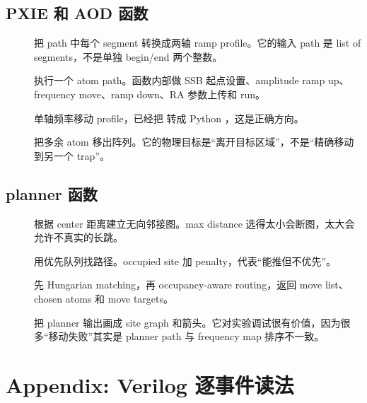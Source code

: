 \documentclass[11pt,oneside,openany]{book}
\begin{document}
\section{PXIE 和 AOD 函数}
\begin{description}
  \item[] 把 path 中每个 segment 转换成两轴 ramp profile。它的输入 path 是 list of segments，不是单独 begin/end 两个整数。
  \item[] 执行一个 atom path。函数内部做 SSB 起点设置、amplitude ramp up、frequency move、ramp down、RA 参数上传和 run。
  \item[] 单轴频率移动 profile，已经把  转成 Python ，这是正确方向。
  \item[] 把多余 atom 移出阵列。它的物理目标是“离开目标区域”，不是“精确移动到另一个 trap”。
\end{description}

\section{planner 函数}
\begin{description}
  \item[] 根据 center 距离建立无向邻接图。max distance 选得太小会断图，太大会允许不真实的长跳。
  \item[] 用优先队列找路径。occupied site 加 penalty，代表“能推但不优先”。
  \item[] 先 Hungarian matching，再 occupancy-aware routing，返回 move list、chosen atoms 和 move targets。
  \item[] 把 planner 输出画成 site graph 和箭头。它对实验调试很有价值，因为很多“移动失败”其实是 planner path 与 frequency map 排序不一致。
\end{description}

\chapter{Appendix: Verilog 逐事件读法}
\end{document}
